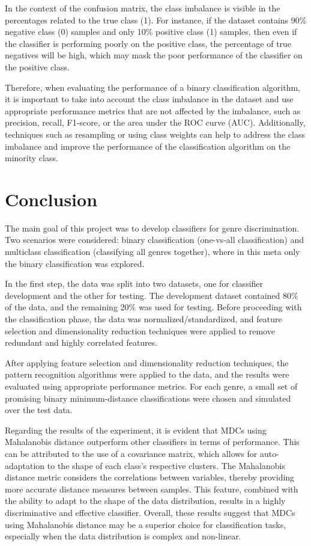 \documentclass[12pt, a4paper]{article}
\begin{document}
In the context of the confusion matrix, the class imbalance is visible in the percentages related to the true class (1). For instance, if the dataset contains 90\% negative class (0) samples and only 10\% positive class (1) samples, then even if the classifier is performing poorly on the positive class, the percentage of true negatives will be high, which may mask the poor performance of the classifier on the positive class.

Therefore, when evaluating the performance of a binary classification algorithm, it is important to take into account the class imbalance in the dataset and use appropriate performance metrics that are not affected by the imbalance, such as precision, recall, F1-score, or the area under the ROC curve (AUC). Additionally, techniques such as resampling or using class weights can help to address the class imbalance and improve the performance of the classification algorithm on the minority class.



\newpage
\section{Conclusion}
 The main goal of this project was to develop classifiers for genre discrimination. Two scenarios were considered: binary classification (one-vs-all classification) and multiclass classification (classifying all genres together), where in this meta only the binary classification was explored.

In the first step, the data was split into two datasets, one for classifier development and the other for testing. The development dataset contained 80\% of the data, and the remaining 20\% was used for testing. Before proceeding with the classification phase, the data was normalized/standardized, and feature selection and dimensionality reduction techniques were applied to remove redundant and highly correlated features.

After applying feature selection and dimensionality reduction techniques, the pattern recognition algorithms were applied to the data, and the results were evaluated using appropriate performance metrics. 
For each genre, a small set of promising binary minimum-distance classifications were chosen and simulated over the test data.

Regarding the results of the experiment, it is evident that MDCs using Mahalanobis distance outperform other classifiers in terms of performance. This can be attributed to the use of a covariance matrix, which allows for auto-adaptation to the shape of each class's respective clusters. The Mahalanobis distance metric considers the correlations between variables, thereby providing more accurate distance measures between samples. This feature, combined with the ability to adapt to the shape of the data distribution, results in a highly discriminative and effective classifier. Overall, these results suggest that MDCs using Mahalanobis distance may be a superior choice for classification tasks, especially when the data distribution is complex and non-linear.
\end{document}
